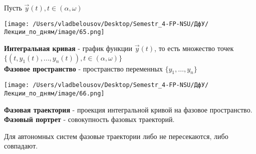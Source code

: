 \documentclass[12pt, a4paper]{report}
\begin{document}
\fi


Пусть \( \vec{ y } (t ) , t \in  (\alpha , \omega ) \) 

\begin{center}
    \texttt{[image: /Users/vladbelousov/Desktop/Semestr\_4-FP-NSU/ДфУ/Лекции\_по\_дням/image/65.png]}
\end{center}

\textbf{Интегральная кривая} - график функции \( \vec{y } (t )  \), то есть множество точек \( \{(t, y_1(t ), ..., y_n (t ) ) , t \in (\alpha , \omega )\} \) \\

\textbf{Фазовое пространство} - пространство переменных \( \{y_1, \ldots,y_n\} \) 

\begin{center}
    \texttt{[image: /Users/vladbelousov/Desktop/Semestr\_4-FP-NSU/ДфУ/Лекции\_по\_дням/image/66.png]}
\end{center}

\textbf{Фазовая траектория} - проекция интегральной кривой на фазовое пространство.\\ 

\textbf{Фазовый портрет}  - совокупность фазовых траекторий.

\begin{theorem}
    Для автономных систем фазовые траектории либо не пересекаются, либо совпадают.
\end{theorem}
\end{document}
